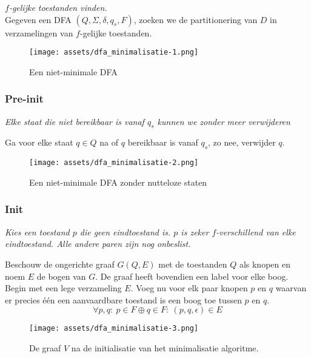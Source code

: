 \documentclass[main.tex]{subfiles}
\begin{document}
\begin{al}
  \label{al:dfa-minimalisatie}
  \emph{$f$-gelijke toestanden vinden.}\\
  Gegeven een DFA $(Q,\Sigma,\delta,q_{s},F)$, zoeken we de partitionering van $D$ in verzamelingen van $f$-gelijke toestanden.

  \begin{figure}[H]
    \centering
    \texttt{[image: assets/dfa\_minimalisatie-1.png]}     
    \caption{Een niet-minimale DFA}
    \label{fig:dfa-minimalisatie-1}
  \end{figure}

  \subsubsection{Pre-init}
  \textit{
    Elke staat die niet bereikbaar is vanaf $q_s$ kunnen we zonder meer verwijderen
  }

  Ga voor elke staat $q\in Q$ na of $q$ bereikbaar is vanaf $q_{s}$, zo nee, verwijder $q$.

  \begin{figure}[H]
    \centering
    \texttt{[image: assets/dfa\_minimalisatie-2.png]}     
    \caption{Een niet-minimale DFA zonder nutteloze staten}
    \label{fig:dfa-minimalisatie-2}
  \end{figure}

  \subsubsection{Init}
  \textit{
    Kies een toestand $p$ die geen eindtoestand is.
    $p$ is zeker $f$-verschillend van elke eindtoestand.
    Alle andere paren zijn nog onbeslist.
  }

  Beschouw de ongerichte graaf $G(Q,E)$ met de toestanden $Q$ als knopen en noem $E$ de bogen van $G$.
  De graaf heeft bovendien een label voor elke boog.
  Begin met een lege verzameling $E$.
  Voeg nu voor elk paar knopen $p$ en $q$ waarvan er precies \'e\'en een aanvaardbare toestand is een boog toe tussen $p$ en $q$.
  \[ \forall p,q:\ p \in F \oplus q \in F:\ (p,q,\epsilon) \in E \]

  \begin{figure}[H]
    \centering
    \texttt{[image: assets/dfa\_minimalisatie-3.png]}     
    \caption{De graaf $V$ na de initialisatie van het minimalisatie algoritme.}
    \label{fig:dfa-minimalisatie-3}
  \end{figure}


\end{al}
\end{document}
